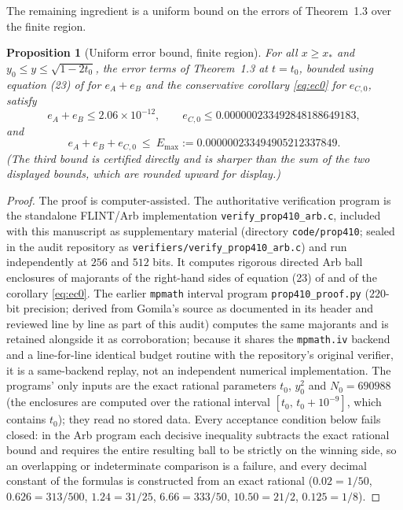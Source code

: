 \documentclass[11pt]{article}
\newtheorem{proposition}[theorem]{Proposition}
\theoremstyle{definition}
\begin{document}
The remaining ingredient is a uniform bound on the errors of
Theorem~1.3 over the finite region.

\begin{proposition}[Uniform error bound, finite region]\label{prop:finiteerr}
For all $x\ge x_*$ and $y_0\le y\le\sqrt{1-2t_0}$, the error terms
of Theorem~1.3 at $t=t_0$, bounded using equation (23) of
\cite{Polymath} for $e_A+e_B$ and the conservative corollary
\eqref{eq:ec0} for $e_{C,0}$, satisfy
\[
e_A+e_B\le2.06\times10^{-12},\qquad
e_{C,0}\le0.000000233492848188649183,
\]
and
\[
e_A+e_B+e_{C,0}\ \le\ E_{\max}:=0.000000233494905212337849 .
\]
(The third bound is certified directly and is sharper than the sum
of the two displayed bounds, which are rounded upward for display.)
\end{proposition}

\begin{proof}
The proof is computer-assisted.  The authoritative verification
program is the standalone FLINT/Arb implementation
\texttt{verify\_prop410\_arb.c}, included with this manuscript as
supplementary material (directory \texttt{code/prop410}; sealed in
the audit repository as \texttt{verifiers/verify\_prop410\_arb.c})
and run independently at $256$ and $512$ bits.  It computes
rigorous directed Arb ball enclosures of majorants of the
right-hand sides of equation (23) of \cite{Polymath} and of the
corollary \eqref{eq:ec0}.  The earlier \texttt{mpmath} interval
program \texttt{prop410\_proof.py} ($220$-bit precision; derived
from Gomila's source as documented in its header and reviewed line
by line as part of this audit) computes the same majorants and is
retained alongside it as corroboration; because it shares the
\texttt{mpmath.iv} backend and a line-for-line identical budget
routine with the repository's original verifier, it is a
same-backend replay, not an independent numerical implementation.
The programs' only inputs are the exact rational parameters
$t_0$, $y_0^2$ and $N_0=690988$ (the enclosures are computed over
the rational interval $[t_0,\,t_0+10^{-9}]$, which contains
$t_0$); they read no stored data.  Every acceptance condition
below fails closed: in the Arb program each decisive inequality
subtracts the exact rational bound and requires the entire
resulting ball to be strictly on the winning side, so an
overlapping or indeterminate comparison is a failure, and every
decimal constant of the formulas is constructed from an exact
rational ($0.02=1/50$, $0.626=313/500$, $1.24=31/25$,
$6.66=333/50$, $10.50=21/2$, $0.125=1/8$).


\end{proof}
\end{document}
